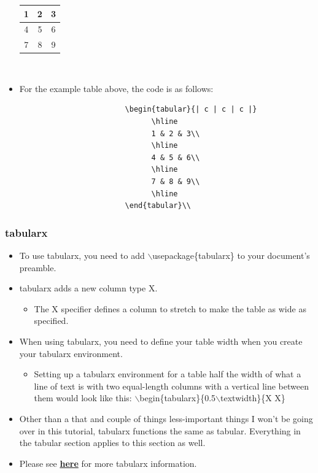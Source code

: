 \documentclass{article}
\begin{document}
\begin{itemize}
					\begin{tabular}{| c | c | c |}
						\hline
						1 & 2 & 3\\
						\hline
						4 & 5 & 6\\
						\hline
						7 & 8 & 9\\
						\hline
					\end{tabular}\\
					\item For the example table above, the code is as follows:
					\begin{verbatim}
						\begin{tabular}{| c | c | c |}
						      \hline
						      1 & 2 & 3\\
						      \hline
						      4 & 5 & 6\\
						      \hline
						      7 & 8 & 9\\
						      \hline
						\end{tabular}\\
					\end{verbatim}
				\end{itemize}
			
			\subsubsection{tabularx}
				\begin{itemize}
					\item To use tabularx, you need to add $\backslash$usepackage\{tabularx\} to your document's preamble.
					\item tabularx adds a new column type X.
					\begin{itemize}
						\item The X specifier defines a column to stretch to make the table as wide as specified.
					\end{itemize}
					\item When using tabularx, you need to define your table width when you create your tabularx environment.
					\begin{itemize}
						\item Setting up a tabularx environment for a table half the width of what a line of text is with two equal-length columns with a vertical line between them would look like this: $\backslash$begin\{tabularx\}\{0.5$\backslash$textwidth\}\{X \textbar{} X\}
					\end{itemize}
					\item Other than a that and couple of things less-important things I won\rq{}t be going over in this tutorial, tabularx functions the same as tabular. Everything in the tabular section applies to this section as well.
					\item Please see \href{https://en.wikibooks.org/wiki/LaTeX/Tables#The_tabularx_package}{\textbf{here}} for more tabularx information.
				\end{itemize}
	
\end{document}
